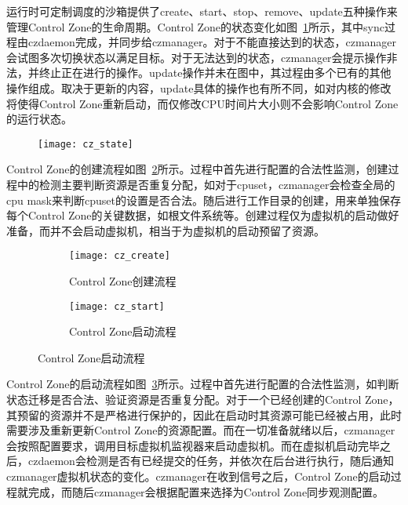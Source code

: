 运行时可定制调度的沙箱提供了create、start、stop、remove、update五种操作来管理Control Zone的生命周期。Control Zone的状态变化如图~\ref{fig:cz_state}所示，其中sync过程由czdaemon完成，并同步给czmanager。对于不能直接达到的状态，czmanager会试图多次切换状态以满足目标。对于无法达到的状态，czmanager会提示操作非法，并终止正在进行的操作。update操作并未在图中，其过程由多个已有的其他操作组成。取决于更新的内容，update具体的操作也有所不同，如对内核的修改将使得Control Zone重新启动，而仅修改CPU时间片大小则不会影响Control Zone的运行状态。

\begin{figure}[!htbp]
    \centering
    \texttt{[image: cz\_state]}
    \label{fig:cz_state}
\end{figure}

Control Zone的创建流程如图~\ref{fig:cz_create}所示。过程中首先进行配置的合法性监测，创建过程中的检测主要判断资源是否重复分配，如对于cpuset，czmanager会检查全局的cpu mask来判断cpuset的设置是否合法。随后进行工作目录的创建，用来单独保存每个Control Zone的关键数据，如根文件系统等。创建过程仅为虚拟机的启动做好准备，而并不会启动虚拟机，相当于为虚拟机的启动预留了资源。

\begin{figure}[H]
    \centering
    \begin{subfigure}[b]{0.42\textwidth}
        \texttt{[image: cz\_create]}
        \caption{\quad Control Zone创建流程}
        \label{fig:cz_create}
    \end{subfigure}
    \hfill
    \begin{subfigure}[b]{0.56\textwidth}
        \texttt{[image: cz\_start]}
        \caption{\quad Control Zone启动流程}
        \label{fig:cz_start}
    \end{subfigure}
\label{fig:cz_create_start}
\end{figure}

Control Zone的启动流程如图~\ref{fig:cz_start}所示。过程中首先进行配置的合法性监测，如判断状态迁移是否合法、验证资源是否重复分配。对于一个已经创建的Control Zone，其预留的资源并不是严格进行保护的，因此在启动时其资源可能已经被占用，此时需要涉及重新更新Control Zone的资源配置。而在一切准备就绪以后，czmanager会按照配置要求，调用目标虚拟机监视器来启动虚拟机。而在虚拟机启动完毕之后，czdaemon会检测是否有已经提交的任务，并依次在后台进行执行，随后通知czmanager虚拟机状态的变化。czmanager在收到信号之后，Control Zone的启动过程就完成，而随后czmanager会根据配置来选择为Control Zone同步观测配置。

